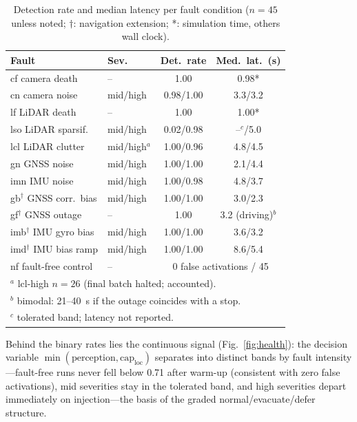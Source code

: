\documentclass[letterpaper, 10pt, conference]{ieeeconf}
\begin{document}
\begin{table}[t]
\caption{Detection rate and median latency per fault condition ($n{=}45$
unless noted; $\dagger$: navigation extension; *: simulation time, others
wall clock).}
\label{tab:detect}
\centering
\footnotesize
\setlength{\tabcolsep}{2pt}
\begin{tabular}{llcc}
\toprule
Fault & Sev. & Det.\ rate & Med.\ lat.\ (s) \\
\midrule
cf camera death & -- & 1.00 & 0.98* \\
cn camera noise & mid/high & 0.98/1.00 & 3.3/3.2 \\
lf LiDAR death & -- & 1.00 & 1.00* \\
lso LiDAR sparsif. & mid/high & 0.02/0.98 & --$^{c}$/5.0 \\
lcl LiDAR clutter & mid/high$^{a}$ & 1.00/0.96 & 4.8/4.5 \\
gn GNSS noise & mid/high & 1.00/1.00 & 2.1/4.4 \\
imn IMU noise & mid/high & 1.00/0.98 & 4.8/3.7 \\
gb$^{\dagger}$ GNSS corr.\ bias & mid/high & 1.00/1.00 & 3.0/2.3 \\
gf$^{\dagger}$ GNSS outage & -- & 1.00 & 3.2 (driving)$^{b}$ \\
imb$^{\dagger}$ IMU gyro bias & mid/high & 1.00/1.00 & 3.6/3.2 \\
imd$^{\dagger}$ IMU bias ramp & mid/high & 1.00/1.00 & 8.6/5.4 \\
\midrule
nf fault-free control & -- & \multicolumn{2}{c}{0 false activations / 45} \\
\bottomrule
\multicolumn{4}{l}{$^{a}$ lcl-high $n{=}26$ (final batch halted; accounted).}\\
\multicolumn{4}{l}{$^{b}$ bimodal: 21--40~s if the outage coincides with a stop.}\\
\multicolumn{4}{l}{$^{c}$ tolerated band; latency not reported.}
\end{tabular}
\vspace{-2mm}
\end{table}

Behind the binary rates lies the continuous signal
(Fig.~\ref{fig:health}): the decision variable
$\min(\mathrm{perception},\mathrm{cap_{loc}})$ separates into distinct
bands by fault intensity---fault-free runs never fell below 0.71 after
warm-up (consistent with zero false activations), mid severities stay in
the tolerated band, and high severities depart immediately on
injection---the basis of the graded normal/evacuate/defer structure.
\end{document}
